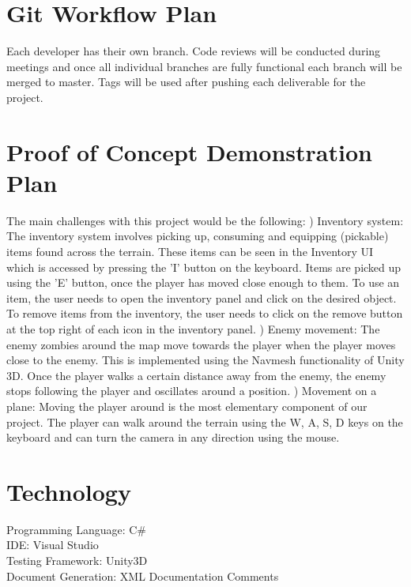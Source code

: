 \documentclass{article}
\begin{document}
\section{Git Workflow Plan}
Each developer has their own branch. Code reviews will be conducted during meetings and once all individual branches are fully functional each branch will be merged to master. Tags will be used after pushing each deliverable for the project.

\section{Proof of Concept Demonstration Plan}
The main challenges with this project would be the following: \newline
{}) Inventory system: The inventory system involves picking up, consuming and equipping (pickable) items found across the terrain. These items can be seen in the Inventory UI which is accessed by pressing the 'I' button on the keyboard. Items are picked up using the 'E' button, once the player has moved close enough to them. To use an item, the user needs to open the inventory panel and click on the desired object. To remove items from the inventory, the user needs to click on the remove button at the top right of each icon in the inventory panel.
\newline
{}) Enemy movement: The enemy zombies around the map move towards the player when the player moves close to the enemy. This is implemented using the Navmesh functionality of Unity 3D. Once the player walks a certain distance away from the enemy, the enemy stops following the player and oscillates around a position.
\newline
{}) Movement on a plane: Moving the player around is the most elementary component of our project. The player can walk around the terrain using the W, A, S, D keys on the keyboard and can turn the camera in any direction using the mouse.

\section{Technology}
Programming Language: C\# \\
IDE: Visual Studio\\
Testing Framework: Unity3D\\
Document Generation: XML Documentation Comments
\end{document}
